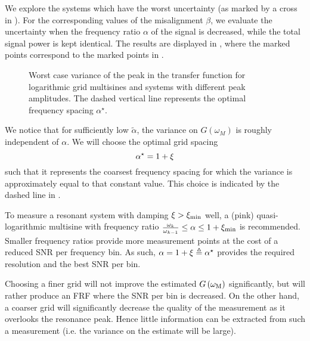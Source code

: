   We explore the systems which have the worst uncertainty (as marked by a cross in ).
  For the corresponding values of the misalignment $\beta$, we evaluate the uncertainty when the frequency ratio $\alpha$ of the signal is decreased, while the total signal power is kept identical.
  The results are displayed in , where the marked points correspond to the marked points in .
  
  \begin{figure}[pht]
    \centering
      \setlength{}
      \setlength\figureheight{0.68\figurewidth}
    
    \caption[Worst-case variance $\sigma_G^2\left( \wM \right)$ as a function of the frequency ratio $\alpha$.]{Worst case variance of the peak in the transfer function for logarithmic
             grid multisines and systems with different peak amplitudes.
             The dashed vertical line represents the optimal frequency spacing $\alpha^{\star}$.}
    \label{fig:excitation:worstCaseAlpha}
  \end{figure}

  We notice that for sufficiently low $\tilde{\alpha}$, the variance on $G\left( \omega_M \right)$ is roughly independent of $\alpha$.
  We will choose the optimal grid spacing
  \begin{equation}
    \alpha^{\star} = 1 + \damping
    \label{eq:excitation:optimAlpha}
  \end{equation}
  such that it represents the coarsest frequency spacing for which the variance is approximately equal to that constant value.
  This choice is indicated by the dashed line in .

   \begin{guideline}
   To measure a resonant system with damping $\damping > \damping[\min]$ well, a (pink) quasi-logarithmic multisine with frequency ratio $\frac{\omega_k}{\omega_{k-1}} \leq \alpha \leq 1 + \damping[\min]$ is recommended.
   Smaller frequency ratios provide more measurement points at the cost of a reduced \gls{SNR} per frequency bin.
   As such, $\alpha = 1 + \damping \isdef \alpha^{\star}$ provides the required resolution and the best \gls{SNR} per bin.
\end{guideline}

  Choosing a finer grid will not improve the estimated $G\left( \wM \right)$ significantly, but will rather produce an \gls{FRF} where the \gls{SNR} per bin is decreased.
  On the other hand, a coarser grid will significantly decrease the quality of the measurement as it overlooks the resonance peak.
  Hence little information can be extracted from such a measurement (i.e. the variance on the estimate will be large).


